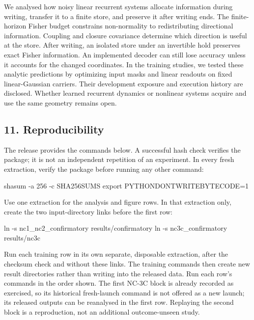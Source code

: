 \documentclass[
  10pt,
]{article}
\newenvironment{Shaded}{}{}
\newcommand{\AttributeTok}[1]{\textcolor[rgb]{0.49,0.56,0.16}{#1}}
\newcommand{\BuiltInTok}[1]{\textcolor[rgb]{0.00,0.50,0.00}{#1}}
\newcommand{\ExtensionTok}[1]{#1}
\newcommand{\FunctionTok}[1]{\textcolor[rgb]{0.02,0.16,0.49}{#1}}
\newcommand{\NormalTok}[1]{#1}
\newcommand{\OperatorTok}[1]{\textcolor[rgb]{0.40,0.40,0.40}{#1}}
\newcommand{\VariableTok}[1]{\textcolor[rgb]{0.10,0.09,0.49}{#1}}
\begin{document}
We analysed how noisy linear recurrent systems allocate information
during writing, transfer it to a finite store, and preserve it after
writing ends. The finite-horizon Fisher budget constrains non-normality
to redistributing directional information. Coupling and closure
covariance determine which direction is useful at the store. After
writing, an isolated store under an invertible hold preserves exact
Fisher information. An implemented decoder can still lose accuracy
unless it accounts for the changed coordinates. In the training studies,
we tested these analytic predictions by optimizing input masks and
linear readouts on fixed linear-Gaussian carriers. Their development
exposure and execution history are disclosed. Whether learned recurrent
dynamics or nonlinear systems acquire and use the same geometry remains
open.

\subsection{11. Reproducibility}\label{reproducibility}

The release provides the commands below. A successful hash check
verifies the package; it is not an independent repetition of an
experiment. In every fresh extraction, verify the package before running
any other command:

\begin{Shaded}
\begin{Highlighting}[]
\ExtensionTok{shasum} \AttributeTok{{-}a}\NormalTok{ 256 }\AttributeTok{{-}c}\NormalTok{ SHA256SUMS}
\BuiltInTok{export} \VariableTok{PYTHONDONTWRITEBYTECODE}\OperatorTok{=}\NormalTok{1}
\end{Highlighting}
\end{Shaded}

Use one extraction for the analysis and figure rows. In that extraction
only, create the two input-directory links before the first row:

\begin{Shaded}
\begin{Highlighting}[]
\FunctionTok{ln} \AttributeTok{{-}s}\NormalTok{ nc1\_nc2\_confirmatory results/confirmatory}
\FunctionTok{ln} \AttributeTok{{-}s}\NormalTok{ nc3c\_confirmatory results/nc3c}
\end{Highlighting}
\end{Shaded}

Run each training row in its own separate, disposable extraction, after
the checksum check and without these links. The training commands then
create new result directories rather than writing into the released
data. Run each row's commands in the order shown. The first NC-3C block
is already recorded as exercised, so its historical fresh-launch command
is not offered as a new launch; its released outputs can be reanalysed
in the first row. Replaying the second block is a reproduction, not an
additional outcome-unseen study.
\end{document}
